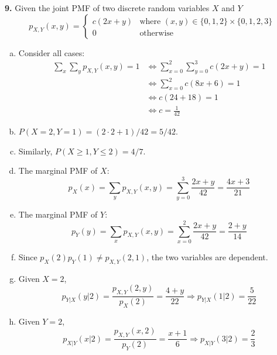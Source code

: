 \documentclass[a4paper,12pt]{article}
\newcommand{\exercise}[1]{\noindent\textbf{#1.}}
\begin{document}
\exercise 9  Given the joint PMF of two discrete random variables $X$ and $Y$
\[p_{X,Y}(x, y) = \begin{cases}
  c(2x + y) &\text{where }(x, y)\in\{0, 1, 2\}\times\{0, 1, 2, 3\}\\
  0 &\text{otherwise}
\end{cases}\]
\begin{enumerate}[(a)]
  \item Consider all cases:
    \begin{align*}
      \sum_x\sum_y p_{X,Y}(x, y) = 1
      &\iff \sum_{x=0}^2\sum_{y=0}^3 c(2x + y) = 1\\
      &\iff \sum_{x=0}^2 c(8x + 6) = 1\\
      &\iff c(24 + 18) = 1\\
      &\iff c = \frac{1}{42}
    \end{align*}
  \item $P(X = 2, Y = 1) = (2\cdot 2 + 1)/42 = 5/42$.
  \item Similarly, $P(X \ge 1, Y \le 2) = 4/7$.
  \item The marginal PMF of $X$:
    \[p_X(x) = \sum_y p_{X,Y}(x, y)
    = \sum_{y=0}^3\frac{2x + y}{42} = \frac{4x + 3}{21}\]
  \item The marginal PMF of $Y$:
    \[p_Y(y) = \sum_x p_{X,Y}(x, y)
    = \sum_{x=0}^2\frac{2x + y}{42} = \frac{2 + y}{14}\]
  \item Since $p_X(2)p_Y(1) \neq p_{X,Y}(2, 1)$,
    the two variables are dependent.
  \item Given $X = 2$,
    \[p_{Y|X}(y|2) = \frac{p_{X,Y}(2, y)}{p_X(2)} = \frac{4 + y}{22}
    \Longrightarrow p_{Y|X}(1|2) = \frac{5}{22}\]
  \item Given $Y = 2$,
    \[p_{X|Y}(x|2) = \frac{p_{X,Y}(x, 2)}{p_Y(2)} = \frac{x + 1}{6}
    \Longrightarrow p_{X|Y}(3|2) = \frac{2}{3}\]
\end{enumerate}
\end{document}
